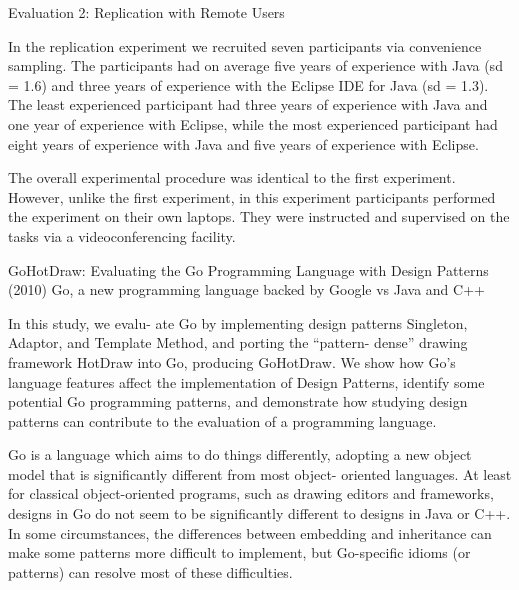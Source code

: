 		
						
Evaluation 2: Replication with Remote Users
						
In the replication experiment we recruited seven participants via convenience sampling. The participants had on average five years of experience with Java (sd = 1.6) and three years of experience with the Eclipse IDE for Java (sd = 1.3). The least experienced participant had three years of experience with Java and one year of experience with Eclipse, while the most experienced participant had eight years of experience with Java and five years of experience with Eclipse.
						
The overall experimental procedure was identical to the first experiment. However, unlike the first experiment, in this experiment participants performed the experiment on their own laptops. They were instructed and supervised on the tasks via a videoconferencing facility. 
	
				
					
GoHotDraw: Evaluating the Go Programming Language with Design Patterns (2010)						
Go, a new programming language backed by Google vs Java and C++
					
In this study, we evalu- ate Go by implementing design patterns Singleton, Adaptor, and Template Method, and porting the “pattern- dense” drawing framework HotDraw into Go, producing GoHotDraw. We show how Go’s language features affect the implementation of Design Patterns, identify some potential Go programming patterns, and demonstrate how studying design patterns can contribute to the evaluation of a programming language. 			
					
Go is a language which aims to do things differently, adopting a new object model that is significantly different from most object- oriented languages. At least for classical object-oriented programs, such as drawing editors and frameworks, designs in Go do not seem to be significantly different to designs in Java or C++. In some circumstances, the differences between embedding and inheritance can make some patterns more difficult to implement, but Go-specific idioms (or patterns) can resolve most of these difficulties. 

